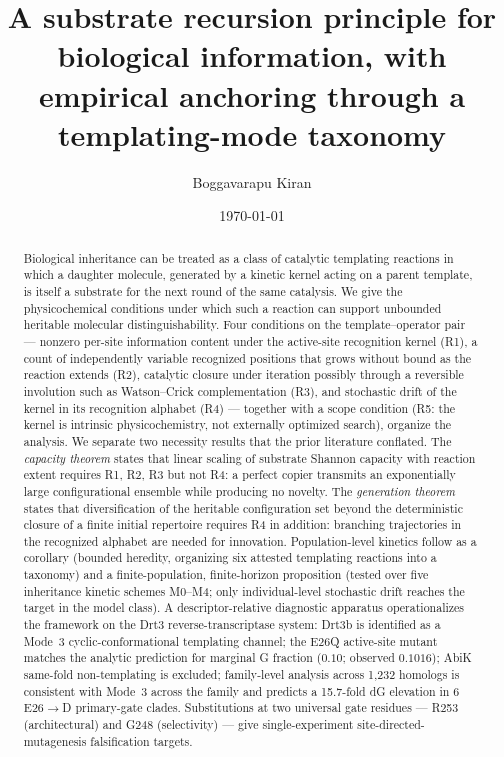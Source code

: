 \documentclass[aps,prx,reprint,amsmath,amssymb,floatfix,superscriptaddress,nofootinbib]{revtex4-2}
\theoremstyle{plain-thm}
\theoremstyle{definition-thm}
\begin{document}
\title{A substrate recursion principle for biological information, with empirical anchoring through a templating-mode taxonomy}

\author{Boggavarapu Kiran}

\date{\today}

\begin{abstract}
Biological inheritance can be treated as a class of catalytic templating reactions in which a daughter molecule, generated by a kinetic kernel acting on a parent template, is itself a substrate for the next round of the same catalysis. We give the physicochemical conditions under which such a reaction can support unbounded heritable molecular distinguishability. Four conditions on the template--operator pair --- nonzero per-site information content under the active-site recognition kernel (R1), a count of independently variable recognized positions that grows without bound as the reaction extends (R2), catalytic closure under iteration possibly through a reversible involution such as Watson--Crick complementation (R3), and stochastic drift of the kernel in its recognition alphabet (R4) --- together with a scope condition (R5: the kernel is intrinsic physicochemistry, not externally optimized search), organize the analysis. We separate two necessity results that the prior literature conflated. The \emph{capacity theorem} states that linear scaling of substrate Shannon capacity with reaction extent requires R1, R2, R3 but not R4: a perfect copier transmits an exponentially large configurational ensemble while producing no novelty. The \emph{generation theorem} states that diversification of the heritable configuration set beyond the deterministic closure of a finite initial repertoire requires R4 in addition: branching trajectories in the recognized alphabet are needed for innovation. Population-level kinetics follow as a corollary (bounded heredity, organizing six attested templating reactions into a taxonomy) and a finite-population, finite-horizon proposition (tested over five inheritance kinetic schemes M0--M4; only individual-level stochastic drift reaches the target in the model class). A descriptor-relative diagnostic apparatus operationalizes the framework on the Drt3 reverse-transcriptase system: Drt3b is identified as a Mode~3 cyclic-conformational templating channel; the E26Q active-site mutant matches the analytic prediction for marginal G fraction ($0.10$; observed $0.1016$); AbiK same-fold non-templating is excluded; family-level analysis across 1{,}232 homologs is consistent with Mode~3 across the family and predicts a 15.7-fold dG elevation in 6 E26$\to$D primary-gate clades. Substitutions at two universal gate residues --- R253 (architectural) and G248 (selectivity) --- give single-experiment site-directed-mutagenesis falsification targets.
\end{abstract}
\end{document}
